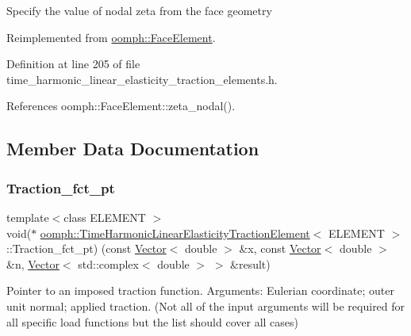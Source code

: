 Specify the value of nodal zeta from the face geometry 

Reimplemented from \hyperlink{classoomph_1_1FaceElement_a58c9f93705c7741f76c8487d152e68a6}{oomph\+::\+Face\+Element}.



Definition at line 205 of file time\+\_\+harmonic\+\_\+linear\+\_\+elasticity\+\_\+traction\+\_\+elements.\+h.



References oomph\+::\+Face\+Element\+::zeta\+\_\+nodal().



\subsection{Member Data Documentation}
\mbox{\label{classoomph_1_1TimeHarmonicLinearElasticityTractionElement_a3d2ab9d7d06924902ee589e17a8449a9}} 
\subsubsection{\texorpdfstring{Traction\+\_\+fct\+\_\+pt}{Traction\_fct\_pt}}
{\footnotesize\ttfamily template$<$class E\+L\+E\+M\+E\+NT $>$ \\
void($\ast$ \hyperlink{classoomph_1_1TimeHarmonicLinearElasticityTractionElement}{oomph\+::\+Time\+Harmonic\+Linear\+Elasticity\+Traction\+Element}$<$ E\+L\+E\+M\+E\+NT $>$\+::Traction\+\_\+fct\+\_\+pt) (const \hyperlink{classoomph_1_1Vector}{Vector}$<$ double $>$ \&x, const \hyperlink{classoomph_1_1Vector}{Vector}$<$ double $>$ \&n, \hyperlink{classoomph_1_1Vector}{Vector}$<$ std\+::complex$<$ double $>$ $>$ \&result)\hspace{0.3cm}{\ttfamily [protected]}}



Pointer to an imposed traction function. Arguments\+: Eulerian coordinate; outer unit normal; applied traction. (Not all of the input arguments will be required for all specific load functions but the list should cover all cases) 



